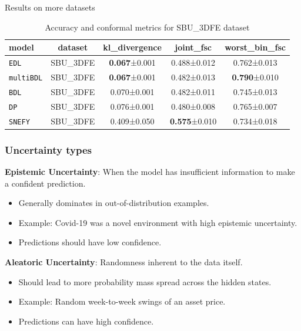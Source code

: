 \documentclass[aspectratio=169]{beamer}
\begin{document}
\begin{frame}{Results on more datasets}

\begin{table}[h]
\centering
\caption{Accuracy and conformal metrics for SBU\_3DFE dataset}
\label{tab:sjaffe_sbu_accuracy}

\begin{tabular}{lcccc}
\toprule
\textbf{model} & \textbf{dataset} & \textbf{kl\_divergence} & \textbf{joint\_fsc} & \textbf{worst\_bin\_fsc} \\
\midrule
\texttt{EDL} & SBU\_3DFE & \textbf{0.067}±0.001 & 0.488±0.012 & 0.762±0.013 \\
\texttt{multiBDL} & SBU\_3DFE & \textbf{0.067}±0.001 & 0.482±0.013 & \textbf{0.790}±0.010 \\
\texttt{BDL} & SBU\_3DFE & 0.070±0.001 & 0.482±0.011 & 0.745±0.013 \\
\texttt{DP} & SBU\_3DFE & 0.076±0.001 & 0.480±0.008 & 0.765±0.007 \\
\texttt{SNEFY} & SBU\_3DFE & 0.409±0.050 & \textbf{0.575}±0.010 & 0.734±0.018 
\bottomrule
\end{tabular}

\end{table}
    
\end{frame}

\begin{frame}[t]
    \frametitle{Uncertainty types}
    \textbf{Epistemic Uncertainty}: When the model has insufficient information to make a confident prediction.
    \begin{itemize}
        \item[$\bullet$] Generally dominates in out-of-distribution examples.
        \item[$\circ$] Example: Covid-19 was a novel environment with high epistemic uncertainty.
        \item[$\rightarrow$] Predictions should have low confidence.
    \end{itemize}
   
    \textbf{Aleatoric Uncertainty}: Randomness inherent to the data itself.
    \begin{itemize}
        \item[$\bullet$] Should lead to more probability mass spread across the hidden states.
        \item[$\circ$] Example: Random week-to-week swings of an asset price.
        \item[$\rightarrow$] Predictions can have high confidence.
    \end{itemize}
\end{frame}
\end{document}
